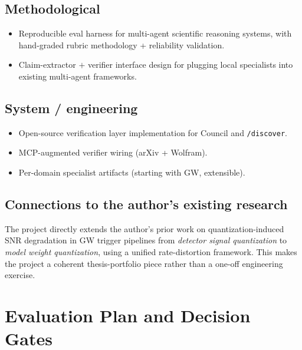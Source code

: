 \documentclass[11pt]{article}
\begin{document}
\subsection{Methodological}
\begin{itemize}
  \item Reproducible eval harness for multi-agent scientific reasoning systems, with hand-graded rubric methodology + reliability validation.
  \item Claim-extractor $+$ verifier interface design for plugging local specialists into existing multi-agent frameworks.
\end{itemize}

\subsection{System / engineering}
\begin{itemize}
  \item Open-source verification layer implementation for Council and \texttt{/discover}.
  \item MCP-augmented verifier wiring (arXiv + Wolfram).
  \item Per-domain specialist artifacts (starting with GW, extensible).
\end{itemize}

\subsection{Connections to the author's existing research}
The project directly extends the author's prior work on quantization-induced SNR degradation in GW trigger pipelines from \emph{detector signal quantization} to \emph{model weight quantization}, using a unified rate-distortion framework. This makes the project a coherent thesis-portfolio piece rather than a one-off engineering exercise.

\section{Evaluation Plan and Decision Gates}
\end{document}
